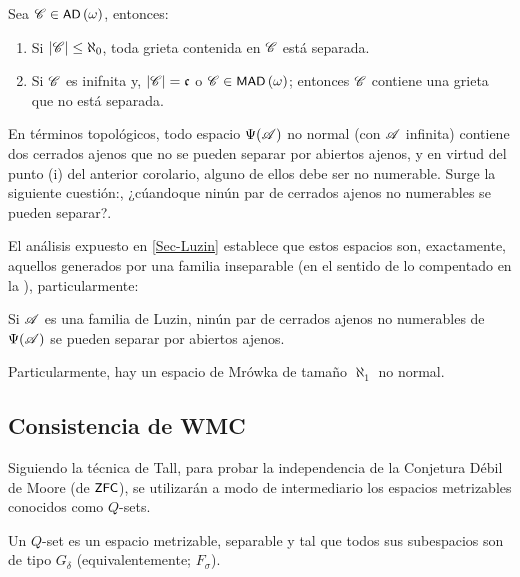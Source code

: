     \begin{corolario}\label{col-tra-interrelacion}
        Sea $\mathscr{C}\in \operatorname{\text{\textsf{\small AD}}}\,(\omega)$, entonces:
        \begin{enumerate}
            \item Si $|\mathscr{C}|\leq \aleph_0$, toda grieta contenida en $\mathscr{C}$ está separada.
            \item Si $\mathscr{C}$ es inifnita y, $|\mathscr{C}|=\mathfrak{c}$ o $\mathscr{C}\in \operatorname{\text{\textsf{\small MAD}}}\,(\omega)$; entonces $\mathscr{C}$ contiene una grieta que no está separada.
        \end{enumerate}
    \end{corolario}
    
    En términos topológicos, todo espacio $\Psi(\mathscr{A})$ no normal (con $\mathscr{A}$ infinita) contiene dos cerrados ajenos que no se pueden separar por abiertos ajenos, y en virtud del punto (i) del anterior corolario, alguno de ellos debe ser no numerable. Surge la siguiente cuestión:, ¿cúandoque ninún par de cerrados ajenos no numerables se pueden separar?.

    El análisis expuesto en \autoref{Sec-Luzin} establece que estos espacios son, exactamente, aquellos generados por una familia inseparable (en el sentido de lo compentado en la \pageref{def-FamInseparable}), particularmente:

    \begin{corolario}\label{cor-MrowkaLuzin}
        Si $\mathscr{A}$ es una familia de Luzin, ninún par de cerrados ajenos no numerables de $\Psi(\mathscr{A})$ se pueden separar por abiertos ajenos.

        Particularmente, hay un espacio de Mrówka de tamaño $\aleph_1$ no normal.
    \end{corolario}

    \subsection{Consistencia de \textsf{WMC}}
    \label{Sec-PDM}

    Siguiendo la técnica de Tall, para probar la independencia de la Conjetura Débil de Moore (de $\text{\textsf{\small ZFC}}$), se utilizarán a modo de intermediario los espacios metrizables conocidos como $Q$-sets.

    \begin{definicion}\label{def-Qset}
        Un $Q$-set es un espacio metrizable, separable y tal que todos sus subespacios son de tipo $G_\delta$ (equivalentemente; $F_\sigma$).
    \end{definicion}

